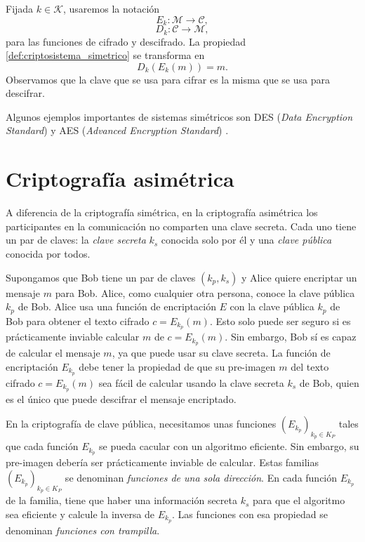 Fijada $k \in \mathcal{K}$, usaremos la notación 
\[
    E_k : \mathcal{M} \rightarrow \mathcal{C},
\]  
\[
    D_k : \mathcal{C} \rightarrow \mathcal{M},
\]
para las funciones de cifrado y descifrado. La propiedad \ref{def:criptosistema_simetrico} se transforma en
\[
    D_k \left( E_k (m) \right) = m.
\]
Observamos que la clave que se usa para cifrar es la misma que se usa para descifrar.

Algunos ejemplos importantes de sistemas simétricos son DES (\emph{Data Encryption Standard}) y AES (\emph{Advanced Encryption Standard}) \cite[Sección 2.1]{Introduction_to_cryptography}.

\section{Criptografía asimétrica}

A diferencia de la criptografía simétrica, en la criptografía asimétrica los participantes en la comunicación no comparten una clave secreta. Cada uno tiene un par de claves: la \emph{clave secreta} $k_s$ conocida solo por él y una \emph{clave pública} conocida por todos.

Supongamos que Bob tiene un par de claves $(k_p, k_s)$ y Alice quiere encriptar un mensaje $m$ para Bob. Alice, como cualquier otra persona, conoce la clave pública $k_p$ de Bob. Alice usa una función de encriptación $E$ con la clave pública $k_p$ de Bob para obtener el texto cifrado $c = E_{k_p}(m)$. Esto solo puede ser seguro si es prácticamente inviable calcular $m$ de $c = E_{k_p}(m)$. Sin embargo, Bob sí es capaz de calcular el mensaje $m$, ya que puede usar su clave secreta. La función de encriptación $E_{k_p}$ debe tener la propiedad de que su pre-imagen $m$ del texto cifrado $c = E_{k_p}(m)$ sea fácil de calcular usando la clave secreta $k_s$ de Bob, quien es el único que puede descifrar el mensaje encriptado.

En la criptografía de clave pública, necesitamos unas funciones $\left( E_{k_p} \right)_{k_p \in K_P}$ tales que cada función $E_{k_p}$ se pueda cacular con un algoritmo eficiente. Sin embargo, su pre-imagen debería ser prácticamente inviable de calcular. Estas familias $\left( E_{k_p} \right)_{k_p \in K_P}$ se denominan \emph{funciones de una sola dirección}. En cada función $E_{k_p}$ de la familia, tiene que haber una información secreta $k_s$ para que el algoritmo sea eficiente y calcule la inversa de $E_{k_p}$. Las funciones con esa propiedad se denominan \emph{funciones con trampilla}.

